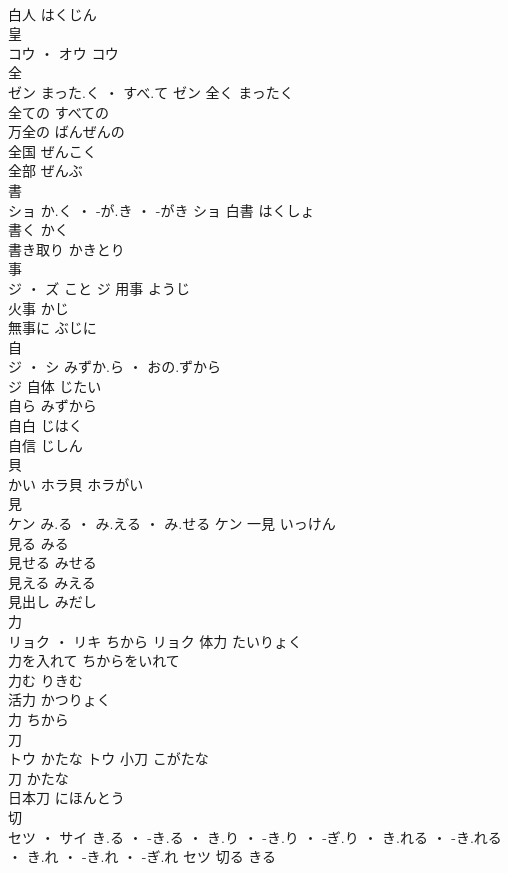 \documentclass[8pt]{extreport}
\begin{document}
\begin{CJK}{UTF8}{min}
\\	白人	はくじん	
\\	皇	
\\	コウ ・ オウ		コウ																																			
\\	全	
\\	ゼン	まった.く ・ すべ.て	ゼン	全く	まったく	
\\	全ての	すべての	
\\	万全の	ばんぜんの	
\\	全国	ぜんこく	
\\	全部	ぜんぶ	
\\	書	
\\	ショ	か.く ・ -が.き ・ -がき	ショ	白書	はくしょ	
\\	書く	かく	
\\	書き取り	かきとり	
\\	事	
\\	ジ ・ ズ	こと	ジ	用事	ようじ	
\\	火事	かじ	
\\	無事に	ぶじに	
\\	自	
\\	ジ ・ シ	みずか.ら ・ おの.ずから
\\	ジ	自体	じたい	
\\	自ら	みずから	
\\	自白	じはく	
\\	自信	じしん	
\\	貝	
\\	かい														ホラ貝	ホラがい	
\\	見	
\\	ケン	み.る ・ み.える ・ み.せる	ケン	一見	いっけん	
\\	見る	みる	
\\	見せる	みせる	
\\	見える	みえる	
\\	見出し	みだし	
\\	力	
\\	リョク ・ リキ	ちから	リョク	体力	たいりょく	
\\	力を入れて	ちからをいれて	
\\	力む	りきむ	
\\	活力	かつりょく	
\\	力	ちから	
\\	刀	
\\	トウ	かたな	トウ	小刀	こがたな	
\\	刀	かたな	
\\	日本刀	にほんとう	
\\	切	
\\	セツ ・ サイ	き.る ・ -き.る ・ き.り ・ -き.り ・ -ぎ.り ・ き.れる ・ -き.れる ・ き.れ ・ -き.れ ・ -ぎ.れ	セツ	切る	きる	

\end{CJK}
\end{document}
